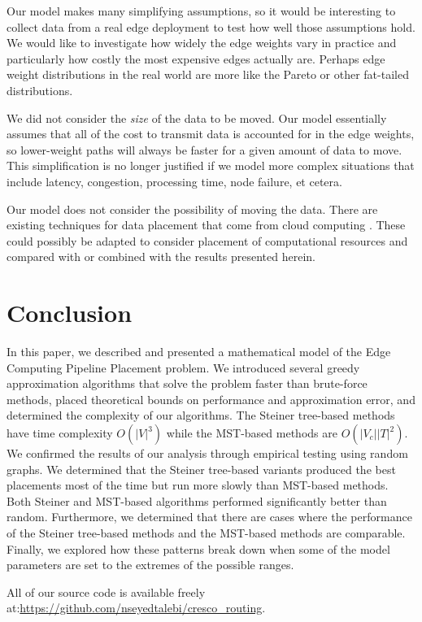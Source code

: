 \documentclass[conference]{IEEEtran}
\begin{document}
 	Our model makes many simplifying assumptions, so it would be interesting to collect data from a real edge deployment to test how well those assumptions hold. We would like to investigate how widely the edge weights vary in practice and particularly how costly the most expensive edges actually are. Perhaps edge weight distributions in the real world are more like the Pareto or other fat-tailed distributions.
 	 
 	 We did not consider the \textit{size} of the data to be moved. Our model essentially assumes that all of the cost to transmit data is accounted for in the edge weights, so lower-weight paths will always be faster for a given amount of data to move. This simplification is no longer justified if we model more complex situations that include latency, congestion, processing time, node failure, et cetera.
 	 
 	 Our model does not consider the possibility of moving the data. There are existing techniques for data placement that come from cloud computing \cite{MazumdarSomnath2019Asod}. These could possibly be adapted to consider placement of computational resources and compared with or combined with the results presented herein.
 	  
 	 \section{Conclusion}
 	 In this paper, we described and presented a mathematical model of the Edge Computing Pipeline Placement problem. We introduced several greedy approximation algorithms that solve the problem faster than brute-force methods, placed theoretical bounds on performance and approximation error, and determined the complexity of our algorithms. The Steiner tree-based methods have time complexity $O(|V|^{3})$ while the MST-based methods are $O(|V_{c}||T|^{2})$. We confirmed the results of our analysis through empirical testing using random graphs. We determined that the Steiner tree-based variants produced the best placements most of the time but run more slowly than MST-based methods. Both Steiner and MST-based algorithms performed significantly better than random. Furthermore, we determined that there are cases where the performance of the Steiner tree-based methods and the MST-based methods are comparable. Finally, we explored how these patterns break down when some of the model parameters are set to the extremes of the possible ranges.

	All of our source code is available freely at:\url{https://github.com/nseyedtalebi/cresco_routing}.
	
	\nocite{matplotlib}
	\nocite{gephi}
	
	
\end{document}
